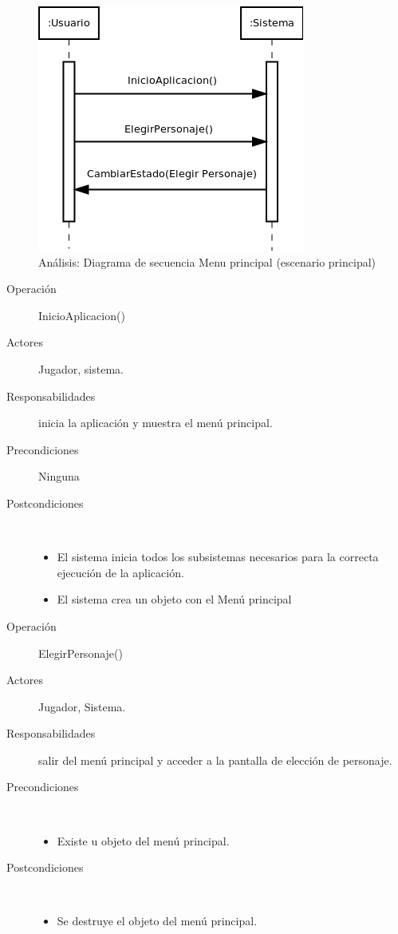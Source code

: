 \begin{figure}[H]
  \label{secuencia_menu_principal1}
  \begin{center}
    \includegraphics[scale=0.6]{imagenes/analisis/secuencia_menu_principal1.png}
  \end{center}
  \caption{Análisis: Diagrama de secuencia Menu principal (escenario principal)}
\end{figure}

\begin{description}
    \item [Operación] InicioAplicacion()
    \item [Actores] Jugador, sistema.
    \item [Responsabilidades] inicia la aplicación y muestra el menú principal.
    \item [Precondiciones] Ninguna
    \item [Postcondiciones] $\quad$
        \begin{itemize}
            \item El sistema inicia todos los subsistemas necesarios para la correcta ejecución de la aplicación.
            \item El sistema crea un objeto con el Menú principal
        \end{itemize}
\end{description}

\begin{description}
    \item [Operación] ElegirPersonaje()
    \item [Actores] Jugador, Sistema.
    \item [Responsabilidades] salir del menú principal y acceder a la pantalla de elección de personaje.
    \item [Precondiciones] $\quad$
        \begin{itemize}
            \item Existe u objeto del menú principal.
        \end{itemize}
    \item [Postcondiciones] $\quad$
        \begin{itemize}
            \item Se destruye el objeto del menú principal.
        \end{itemize}
\end{description}

